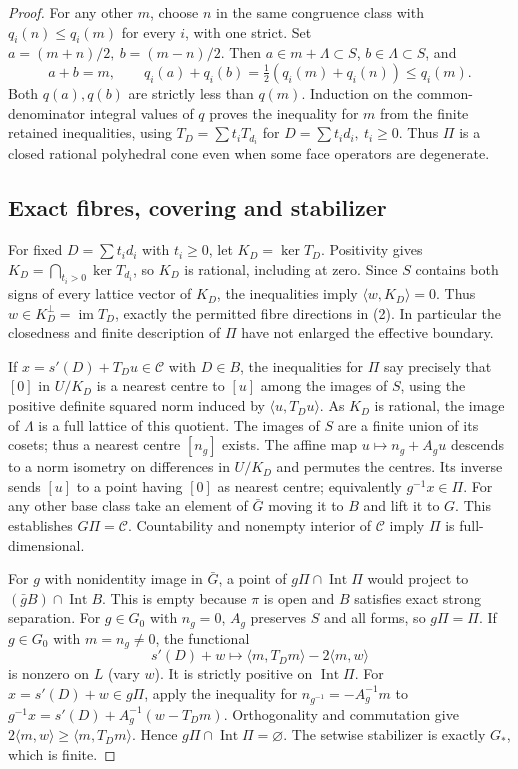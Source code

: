 \documentclass[11pt]{article}
\begin{document}
\begin{proof}
For any other \(m\), choose \(n\) in the same congruence class with \(q_i(n)\le q_i(m)\) for every \(i\), with one strict. Set \(a=(m+n)/2,\ b=(m-n)/2\). Then \(a\in m+\Lambda\subset S\), \(b\in\Lambda\subset S\), and \[
 a+b=m,\qquad q_i(a)+q_i(b)=\tfrac12(q_i(m)+q_i(n))\le q_i(m).
\] Both \(q(a),q(b)\) are strictly less than \(q(m)\). Induction on the common-denominator integral values of \(q\) proves the inequality for \(m\) from the finite retained inequalities, using \(T_D=\sum t_iT_{d_i}\) for \(D=\sum t_id_i,\ t_i\ge0\). Thus \(\Pi\) is a closed rational polyhedral cone even when some face operators are degenerate.

\subsection*{Exact fibres, covering and stabilizer}

For fixed \(D=\sum t_i d_i\) with \(t_i\ge0\), let \(K_D=\ker T_D\). Positivity gives \(K_D=\bigcap_{t_i>0}\ker T_{d_i}\), so \(K_D\) is rational, including at zero. Since \(S\) contains both signs of every lattice vector of \(K_D\), the inequalities imply \(\langle w,K_D\rangle=0\). Thus \(w\in K_D^\perp=\operatorname{im}T_D\), exactly the permitted fibre directions in (2). In particular the closedness and finite description of \(\Pi\) have not enlarged the effective boundary.

If \(x=s'(D)+T_Du\in\mathcal C\) with \(D\in B\), the inequalities for \(\Pi\) say precisely that \([0]\) in \(U/K_D\) is a nearest centre to \([u]\) among the images of \(S\), using the positive definite squared norm induced by \(\langle u,T_Du\rangle\). As \(K_D\) is rational, the image of \(\Lambda\) is a full lattice of this quotient. The images of \(S\) are a finite union of its cosets; thus a nearest centre \([n_g]\) exists. The affine map \(u\mapsto n_g+A_g u\) descends to a norm isometry on differences in \(U/K_D\) and permutes the centres. Its inverse sends \([u]\) to a point having \([0]\) as nearest centre; equivalently \(g^{-1}x\in\Pi\). For any other base class take an element of \(\bar G\) moving it to \(B\) and lift it to \(G\). This establishes \(G\Pi=\mathcal C\). Countability and nonempty interior of \(\mathcal C\) imply \(\Pi\) is full-dimensional.

For \(g\) with nonidentity image in \(\bar G\), a point of \(g\Pi\cap\operatorname{Int}\Pi\) would project to \((\bar g B)\cap\operatorname{Int}B\). This is empty because \(\pi\) is open and \(B\) satisfies exact strong separation. For \(g\in G_0\) with \(n_g=0\), \(A_g\) preserves \(S\) and all forms, so \(g\Pi=\Pi\). If \(g\in G_0\) with \(m=n_g\ne0\), the functional \[
 s'(D)+w\longmapsto \langle m,T_Dm\rangle-2\langle m,w\rangle
\] is nonzero on \(L\) (vary \(w\)). It is strictly positive on \(\operatorname{Int}\Pi\). For \(x=s'(D)+w\in g\Pi\), apply the inequality for \(n_{g^{-1}}=-A_g^{-1}m\) to \(g^{-1}x=s'(D)+A_g^{-1}(w-T_Dm)\). Orthogonality and commutation give \(2\langle m,w\rangle\ge\langle m,T_Dm\rangle\). Hence \(g\Pi\cap\operatorname{Int}\Pi=\varnothing\). The setwise stabilizer is exactly \(G_*\), which is finite.

\end{proof}
\end{document}
